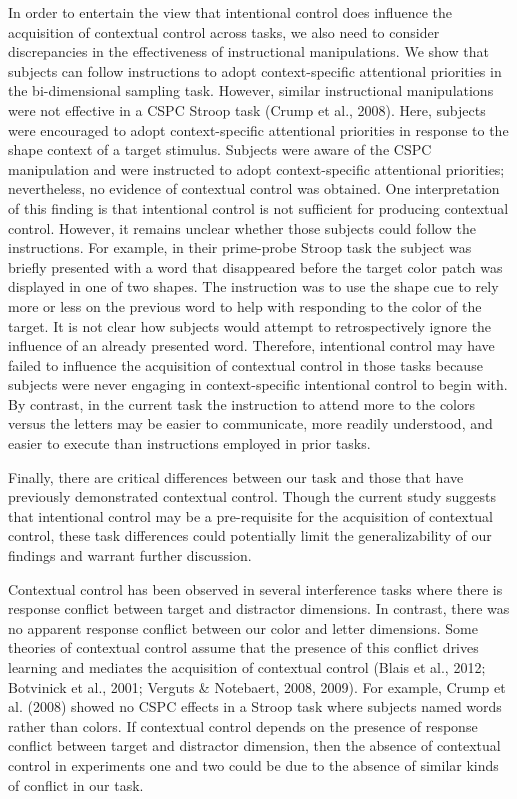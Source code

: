 \documentclass[english,,man,floatsintext]{apa6}
\begin{document}
In order to entertain the view that intentional control does influence
the acquisition of contextual control across tasks, we also need to
consider discrepancies in the effectiveness of instructional
manipulations. We show that subjects can follow instructions to adopt
context-specific attentional priorities in the bi-dimensional sampling
task. However, similar instructional manipulations were not effective in
a CSPC Stroop task (Crump et al., 2008). Here, subjects were encouraged
to adopt context-specific attentional priorities in response to the
shape context of a target stimulus. Subjects were aware of the CSPC
manipulation and were instructed to adopt context-specific attentional
priorities; nevertheless, no evidence of contextual control was
obtained. One interpretation of this finding is that intentional control
is not sufficient for producing contextual control. However, it remains
unclear whether those subjects could follow the instructions. For
example, in their prime-probe Stroop task the subject was briefly
presented with a word that disappeared before the target color patch was
displayed in one of two shapes. The instruction was to use the shape cue
to rely more or less on the previous word to help with responding to the
color of the target. It is not clear how subjects would attempt to
retrospectively ignore the influence of an already presented word.
Therefore, intentional control may have failed to influence the
acquisition of contextual control in those tasks because subjects were
never engaging in context-specific intentional control to begin with. By
contrast, in the current task the instruction to attend more to the
colors versus the letters may be easier to communicate, more readily
understood, and easier to execute than instructions employed in prior
tasks.

Finally, there are critical differences between our task and those that
have previously demonstrated contextual control. Though the current
study suggests that intentional control may be a pre-requisite for the
acquisition of contextual control, these task differences could
potentially limit the generalizability of our findings and warrant
further discussion.

Contextual control has been observed in several interference tasks where
there is response conflict between target and distractor dimensions. In
contrast, there was no apparent response conflict between our color and
letter dimensions. Some theories of contextual control assume that the
presence of this conflict drives learning and mediates the acquisition
of contextual control (Blais et al., 2012; Botvinick et al., 2001;
Verguts \& Notebaert, 2008, 2009). For example, Crump et al. (2008)
showed no CSPC effects in a Stroop task where subjects named words
rather than colors. If contextual control depends on the presence of
response conflict between target and distractor dimension, then the
absence of contextual control in experiments one and two could be due to
the absence of similar kinds of conflict in our task.
\end{document}
